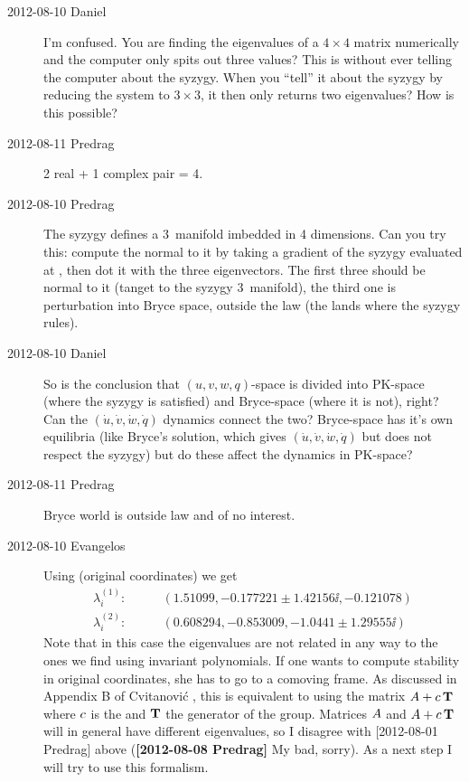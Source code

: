 \begin{description}
\item[2012-08-10 Daniel] I'm confused. You are finding the eigenvalues
of a $4 \times 4$ matrix numerically and the computer only spits out three values?
This is without ever telling the computer about the syzygy. When you
``tell'' it about the syzygy by reducing the system to $3 \times 3$, it
then only returns two eigenvalues? How is this possible?

\item[2012-08-11 Predrag] 2 real + 1 complex pair = 4.

\item[2012-08-10 Predrag] The syzygy defines a 3\dmn\ manifold imbedded
in 4 dimensions. Can you try this: compute the normal to it by taking a
gradient of the syzygy evaluated at , then dot it with the
three eigenvectors. The first three should be normal to it (tanget to the
syzygy 3\dmn\ manifold), the third one is perturbation into Bryce space,
outside the law (the lands where the syzygy rules).

\item[2012-08-10 Daniel] So is the conclusion that $(u,v,w,q)$-space is
divided into PK-space (where the syzygy is satisfied) and Bryce-space
(where it is not), right? Can the $(\dot{u},\dot{v},\dot{w},\dot{q})$ dynamics
connect the two? Bryce-space has it's own equilibria (like Bryce's solution, which
gives $(\dot{u},\dot{v},\dot{w},\dot{q})$ but does not respect the syzygy)
but do these affect the dynamics in PK-space?

\item[2012-08-11 Predrag] Bryce world is outside law and of no interest.

\item[2012-08-10 Evangelos]
Using  (original coordinates) we get
\begin{align}
  \lambda^{(1)}_i:\qquad  & (1.51099, -0.177221 \pm 1.42156 \ii, -0.121078)\\
  \lambda^{(2)}_i:\qquad  & (0.608294, -0.853009, -1.0441 \pm  1.29555 \ii)
\end{align}
Note that in this case the eigenvalues are not related in any way to the
ones we find using invariant polynomials. If one wants to compute
stability in original coordinates, she has to go to a comoving frame. As
discussed in Appendix B of Cvitanovi\'c \etal{}, this is
equivalent to using the matrix $A+c\, \mathbf{T}$ where $c$ is
the {\phaseVel} and $\mathbf{T}$ the generator of the group. Matrices $A$ and
$A+c\, \mathbf{T}$ will in general have different eigenvalues, so I
disagree with [2012-08-01 Predrag] above
({\bf [2012-08-08 Predrag]} My bad, sorry).
As a next step I will try to use this formalism.


\end{description}
